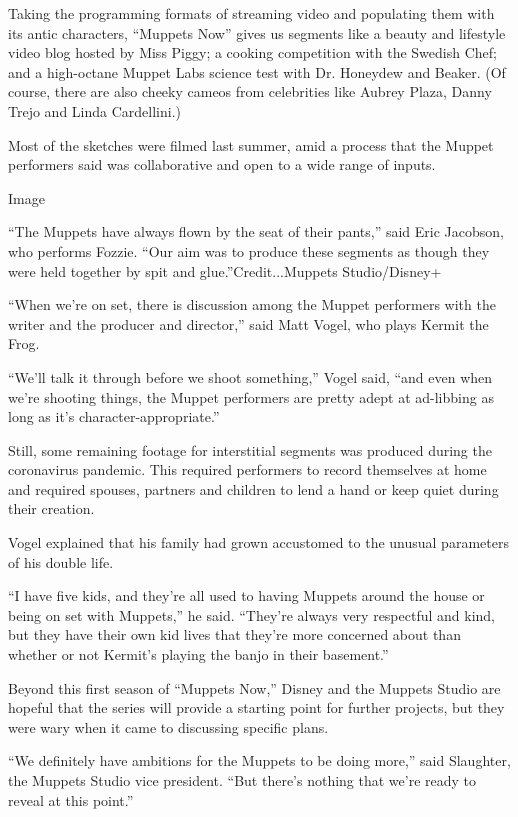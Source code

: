 Taking the programming formats of streaming video and populating them
with its antic characters, ``Muppets Now'' gives us segments like a
beauty and lifestyle video blog hosted by Miss Piggy; a cooking
competition with the Swedish Chef; and a high-octane Muppet Labs science
test with Dr. Honeydew and Beaker. (Of course, there are also cheeky
cameos from celebrities like Aubrey Plaza, Danny Trejo and Linda
Cardellini.)

Most of the sketches were filmed last summer, amid a process that the
Muppet performers said was collaborative and open to a wide range of
inputs.

Image

``The Muppets have always flown by the seat of their pants,'' said Eric
Jacobson, who performs Fozzie. ``Our aim was to produce these segments
as though they were held together by spit and glue.''Credit...Muppets
Studio/Disney+

``When we're on set, there is discussion among the Muppet performers
with the writer and the producer and director,'' said Matt Vogel, who
plays Kermit the Frog.

``We'll talk it through before we shoot something,'' Vogel said, ``and
even when we're shooting things, the Muppet performers are pretty adept
at ad-libbing as long as it's character-appropriate.''

Still, some remaining footage for interstitial segments was produced
during the coronavirus pandemic. This required performers to record
themselves at home and required spouses, partners and children to lend a
hand or keep quiet during their creation.

Vogel explained that his family had grown accustomed to the unusual
parameters of his double life.

``I have five kids, and they're all used to having Muppets around the
house or being on set with Muppets,'' he said. ``They're always very
respectful and kind, but they have their own kid lives that they're more
concerned about than whether or not Kermit's playing the banjo in their
basement.''

Beyond this first season of ``Muppets Now,'' Disney and the Muppets
Studio are hopeful that the series will provide a starting point for
further projects, but they were wary when it came to discussing specific
plans.

``We definitely have ambitions for the Muppets to be doing more,'' said
Slaughter, the Muppets Studio vice president. ``But there's nothing that
we're ready to reveal at this point.''

